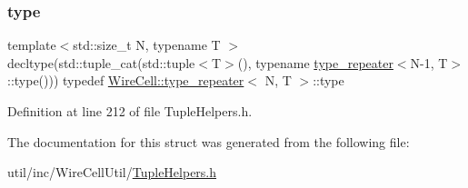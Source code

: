 \subsubsection{\texorpdfstring{type}{type}}
{\footnotesize\ttfamily template$<$std\+::size\+\_\+t N, typename T $>$ \\
decltype(std\+::tuple\+\_\+cat(std\+::tuple$<$T$>$(), typename \hyperlink{struct_wire_cell_1_1type__repeater}{type\+\_\+repeater}$<$N-\/1, T$>$\+::type())) typedef \hyperlink{struct_wire_cell_1_1type__repeater}{Wire\+Cell\+::type\+\_\+repeater}$<$ N, T $>$\+::type}



Definition at line 212 of file Tuple\+Helpers.\+h.



The documentation for this struct was generated from the following file\+:\begin{DoxyCompactItemize}
\item 
util/inc/\+Wire\+Cell\+Util/\hyperlink{_tuple_helpers_8h}{Tuple\+Helpers.\+h}\end{DoxyCompactItemize}
